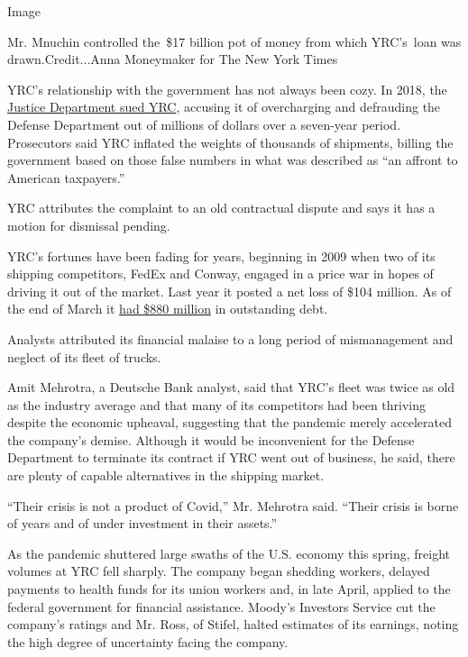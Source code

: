 Image

Mr. Mnuchin controlled the~\$17 billion pot of money from which
YRC's~loan was drawn.Credit...Anna Moneymaker for The New York Times

YRC's relationship with the government has not always been cozy. In
2018, the
\href{https://www.justice.gov/opa/pr/united-states-sues-freight-companies-systematic-overcharging-shipments}{Justice
Department sued YRC}, accusing it of overcharging and defrauding the
Defense Department out of millions of dollars over a seven-year period.
Prosecutors said YRC inflated the weights of thousands of shipments,
billing the government based on those false numbers in what was
described as ``an affront to American taxpayers.''

YRC attributes the complaint to an old contractual dispute and says it
has a motion for dismissal pending.

YRC's fortunes have been fading for years, beginning in 2009 when two of
its shipping competitors, FedEx and Conway, engaged in a price war in
hopes of driving it out of the market. Last year it posted a net loss of
\$104 million. As of the end of March it
\href{https://www.globenewswire.com/news-release/2020/05/11/2031400/0/en/YRC-Worldwide-Reports-First-Quarter-2020-Results.html\#:~:text=OVERLAND\%20PARK\%2C\%20Kan.\%2C\%20May,net\%20gain\%20on\%20property\%20sales.}{had
\$880 million} in outstanding debt.

Analysts attributed its financial malaise to a long period of
mismanagement and neglect of its fleet of trucks.

Amit Mehrotra, a Deutsche Bank analyst, said that YRC's fleet was twice
as old as the industry average and that many of its competitors had been
thriving despite the economic upheaval, suggesting that the pandemic
merely accelerated the company's demise. Although it would be
inconvenient for the Defense Department to terminate its contract if YRC
went out of business, he said, there are plenty of capable alternatives
in the shipping market.

``Their crisis is not a product of Covid,'' Mr. Mehrotra said. ``Their
crisis is borne of years and of under investment in their assets.''

As the pandemic shuttered large swaths of the U.S. economy this spring,
freight volumes at YRC fell sharply. The company began shedding workers,
delayed payments to health funds for its union workers and, in late
April, applied to the federal government for financial assistance.
Moody's Investors Service cut the company's ratings and Mr. Ross, of
Stifel, halted estimates of its earnings, noting the high degree of
uncertainty facing the company.

